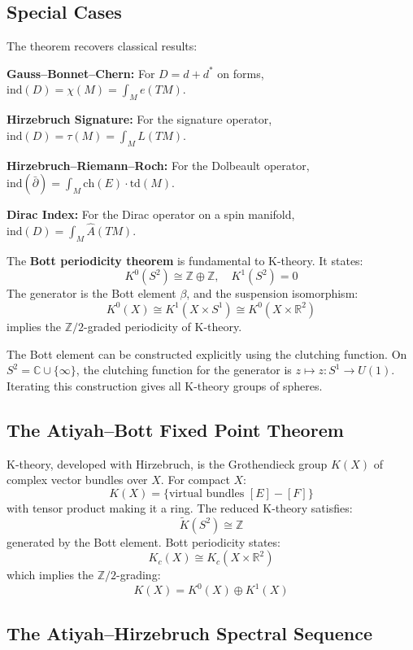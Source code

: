 \subsection*{Special Cases}

The theorem recovers classical results:

\textbf{Gauss--Bonnet--Chern:} For $D = d + d^*$ on forms,
$\text{ind}(D) = \chi(M) = \int_M e(TM)$.

\textbf{Hirzebruch Signature:} For the signature operator,
$\text{ind}(D) = \tau(M) = \int_M L(TM)$.

\textbf{Hirzebruch--Riemann--Roch:} For the Dolbeault operator,
$\text{ind}(\bar{\partial}) = \int_M \text{ch}(E) \cdot \text{td}(M)$.

\textbf{Dirac Index:} For the Dirac operator on a spin manifold,
$\text{ind}(D) = \int_M \widehat{A}(TM)$.

The \textbf{Bott periodicity theorem} is fundamental to K-theory. It states:
\[K^0(S^2) \cong \mathbb{Z}\oplus\mathbb{Z}, \quad K^1(S^2) = 0\]
The generator is the Bott element $\beta$, and the suspension isomorphism:
\[K^0(X) \cong K^1(X \times S^1) \cong K^0(X \times \mathbb{R}^2)\]
implies the $\mathbb{Z}/2$-graded periodicity of K-theory.

The Bott element can be constructed explicitly using the clutching function.
On $S^2 = \mathbb{C} \cup \{\infty\}$, the clutching function for the generator
is $z \mapsto z: S^1 \to U(1)$. Iterating this construction gives all K-theory
groups of spheres.

\subsection*{The Atiyah--Bott Fixed Point Theorem}

K-theory, developed with Hirzebruch, is the Grothendieck group $K(X)$ of
complex vector bundles over $X$. For compact $X$:
\[K(X) = \{\text{virtual bundles } [E] - [F]\}\]
with tensor product making it a ring. The reduced K-theory satisfies:
\[\widetilde{K}(S^2) \cong \mathbb{Z}\]
generated by the Bott element. Bott periodicity states:
\[K_c(X) \cong K_c(X \times \mathbb{R}^2)\]
which implies the $\mathbb{Z}/2$-grading:
\[K(X) = K^0(X) \oplus K^1(X)\]

\subsection*{The Atiyah--Hirzebruch Spectral Sequence}


